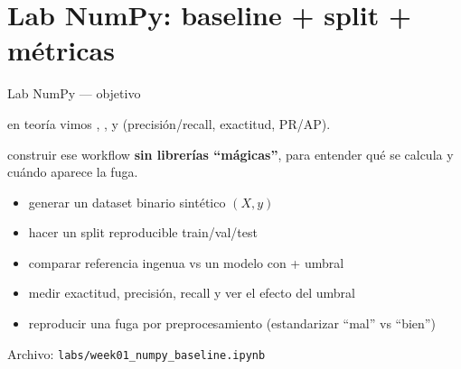 \section[Lab NumPy]{Lab NumPy: baseline + split + métricas}

\begin{frame}{Lab NumPy — objetivo}

 en teoría vimos , ,
 y  (precisión/recall, exactitud, PR/AP).

\vspace{0.4em}
 construir ese workflow \textbf{sin librerías “mágicas”},
para entender qué se calcula y cuándo aparece la fuga.

\vspace{0.3em}
\begin{itemize}\setlength{\itemsep}{0.25em}
  \item generar un dataset binario sintético \((X,y)\)
  \item hacer un split reproducible train/val/test
  \item comparar referencia ingenua vs un modelo con  + umbral
  \item medir exactitud, precisión, recall y ver el efecto del umbral
  \item reproducir una fuga por preprocesamiento (estandarizar “mal” vs “bien”)
\end{itemize}

\small
Archivo: \texttt{labs/week01\_numpy\_baseline.ipynb}
\end{frame}


